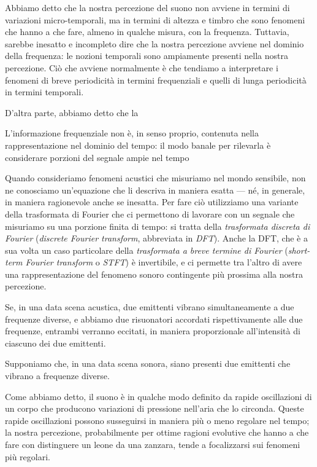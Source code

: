 \documentclass[11pt]{report}
\begin{document}
Abbiamo detto che la nostra percezione del suono non avviene in termini di variazioni micro-temporali, ma in termini di altezza e timbro che sono fenomeni che hanno a che fare, almeno in qualche misura, con la frequenza. Tuttavia, sarebbe inesatto e incompleto dire che la nostra percezione avviene nel dominio della frequenza: le nozioni temporali sono ampiamente presenti nella nostra percezione. Ciò che avviene normalmente è che tendiamo a interpretare i fenomeni di breve periodicità in termini frequenziali e quelli di lunga periodicità in termini temporali. 



D'altra parte, abbiamo detto che la 


L'informazione frequenziale non è, in senso proprio, contenuta nella rappresentazione nel dominio del tempo: il modo banale per rilevarla è considerare porzioni del segnale ampie nel tempo 






Quando consideriamo fenomeni acustici che misuriamo nel mondo sensibile, non ne conosciamo un'equazione che li descriva in maniera esatta --- né, in generale, in maniera ragionevole anche se inesatta. Per fare ciò utilizziamo una variante della trasformata di Fourier che ci permettono di lavorare con un segnale che misuriamo su una porzione finita di tempo: si tratta della \emph{trasformata discreta di Fourier} (\emph{discrete Fourier transform}, abbreviata in \emph{DFT}). Anche la DFT, che è a sua volta un caso particolare della \emph{trasformata a breve termine di Fourier} (\emph{short-term Fourier transform} o \emph{STFT}) è invertibile, e ci permette tra l'altro di avere una rappresentazione del fenomeno sonoro contingente più prossima alla nostra percezione.







Se, in una data scena acustica, due emittenti vibrano simultaneamente a due frequenze diverse, e abbiamo due risuonatori accordati rispettivamente alle due frequenze, entrambi verranno eccitati, in maniera proporzionale all'intensità di ciascuno dei due emittenti. 


Supponiamo che, in una data scena sonora, siano presenti due emittenti che vibrano a frequenze diverse. 



Come abbiamo detto, il suono è in qualche modo definito da rapide oscillazioni di un corpo che producono variazioni di pressione nell'aria che lo circonda. Queste rapide oscillazioni possono susseguirsi in maniera più o meno regolare nel tempo; la nostra percezione, probabilmente per ottime ragioni evolutive che hanno a che fare con distinguere un leone da una zanzara, tende a focalizzarsi sui fenomeni più regolari. 
\end{document}
